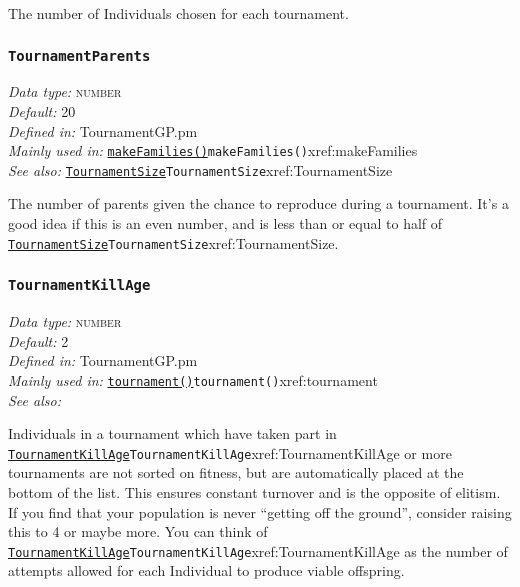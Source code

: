 \documentclass[a4paper]{article}
\begin{document}
The number of Individuals chosen for each tournament.

\subsubsection{\texttt{TournamentParents}}\label{xref:TournamentParents}
\begin{flushleft}
\textit{Data type:} \textsc{number}\\
\textit{Default:} 20\\
\textit{Defined in:} TournamentGP.pm\\
\textit{Mainly used in:} \hyperref[no]{\texttt{makeFamilies()}}{\texttt{makeFamilies()}}{xref:makeFamilies}\\
\textit{See also:} \hyperref[no]{\texttt{TournamentSize}}{\texttt{TournamentSize}}{xref:TournamentSize}
\end{flushleft}

The number of parents given the chance to reproduce during a
tournament.  It's a good idea if this is an even number, and is less
than or equal to half of \hyperref[no]{\texttt{TournamentSize}}{\texttt{TournamentSize}}{xref:TournamentSize}.

\subsubsection{\texttt{TournamentKillAge}}\label{xref:TournamentKillAge}
\begin{flushleft}
\textit{Data type:} \textsc{number}\\
\textit{Default:} 2\\
\textit{Defined in:} TournamentGP.pm\\
\textit{Mainly used in:} \hyperref[no]{\texttt{tournament()}}{\texttt{tournament()}}{xref:tournament}\\
\textit{See also:}
\end{flushleft}

Individuals in a tournament which have taken part in
\hyperref[no]{\texttt{TournamentKillAge}}{\texttt{TournamentKillAge}}{xref:TournamentKillAge} or more tournaments are not sorted on
fitness, but are automatically placed at the bottom of the list.  This
ensures constant turnover and is the opposite of elitism.  If you find
that your population is never ``getting off the ground'', consider
raising this to 4 or maybe more.  You can think of
\hyperref[no]{\texttt{TournamentKillAge}}{\texttt{TournamentKillAge}}{xref:TournamentKillAge} as the number of attempts allowed for each
Individual to produce viable offspring.
\end{document}
